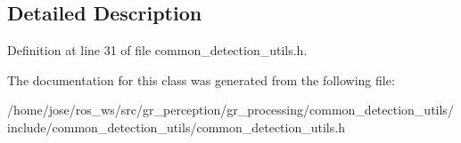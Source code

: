 \subsection{Detailed Description}


Definition at line 31 of file common\+\_\+detection\+\_\+utils.\+h.



The documentation for this class was generated from the following file\+:\begin{DoxyCompactItemize}
\item 
/home/jose/ros\+\_\+ws/src/gr\+\_\+perception/gr\+\_\+processing/common\+\_\+detection\+\_\+utils/include/common\+\_\+detection\+\_\+utils/common\+\_\+detection\+\_\+utils.\+h\end{DoxyCompactItemize}
